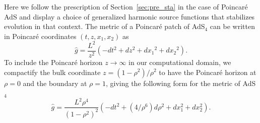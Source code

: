 \documentclass[a4paper,11pt]{article}
\numberwithin{equation}{section}
\begin{document}
Here we follow the prescription of Section~\ref{sec:pre_sta} in the case of Poincar\'e AdS and display a choice of generalized harmonic source functions that stabilizes evolution in that context.
The metric of a Poincar\'e patch of AdS$_4$ can be written in Poincar\'e coordinates $(t,z,x_1,x_2)$ as
\begin{equation}
\label{eq:AdSpoincare}
\hat{g} = \frac{L^2}{z^2} \left( -dt^2 + dz^2 + dx_1{}^2 + dx_2{}^2  \right).
\end{equation}
To include the Poincar\'e horizon $z\rightarrow \infty$ in our computational domain, we compactify the bulk coordinate $z=(1-\rho^2)/\rho^2$ to have the Poincar\'e horizon at $\rho=0$ and the boundary at $\rho=1$, giving the following form for the metric of AdS$_4$
\begin{equation}
\hat{g} = \frac{L^2 \rho^4}{(1-\rho^2)^2} \left( -dt^2 + (4/\rho^6)d\rho^2 + dx_1^2 + dx_2^2  \right).
\end{equation}
\end{document}
